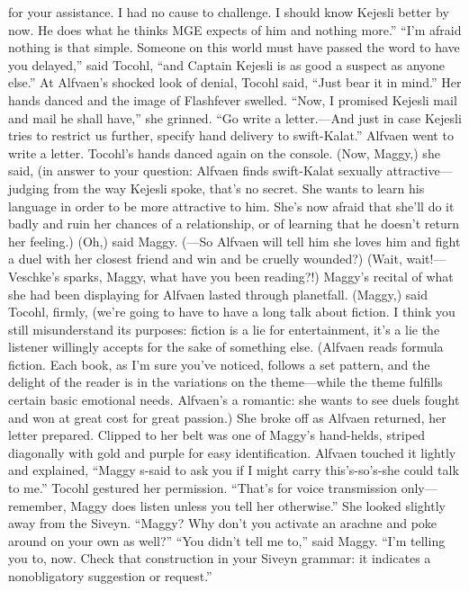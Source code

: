 \documentclass[9pt]{article}
\begin{document}
for your assistance. I had no cause to challenge. I should know Kejesli better by now. He does what he
thinks MGE expects of him and nothing more.”
“I’m afraid nothing is that simple. Someone on this world must have passed the word to have you
delayed,” said Tocohl, “and Captain Kejesli is as good a suspect as anyone else.”
At Alfvaen’s shocked look of denial, Tocohl said, “Just bear it in mind.” Her hands danced and the
image of Flashfever swelled. “Now, I promised Kejesli mail and mail he shall have,” she grinned. “Go
write a letter.—And just in case Kejesli tries to restrict us further, specify hand delivery to swift-Kalat.”
Alfvaen went to write a letter. Tocohl’s hands danced again on the console. (Now, Maggy,) she said,
(in answer to your question: Alfvaen finds swift-Kalat sexually attractive—judging from the way Kejesli
spoke, that’s no secret. She wants to learn his language in order to be more attractive to him. She’s now
afraid that she’ll do it badly and ruin her chances of a relationship, or of learning that he doesn’t return her
feeling.)
(Oh,) said Maggy. (—So Alfvaen will tell him she loves him and fight a duel with her closest friend
and win and be cruelly wounded?)
(Wait, wait!—Veschke’s sparks, Maggy, what have you been reading?!)
Maggy’s recital of what she had been displaying for Alfvaen lasted through planetfall. (Maggy,) said
Tocohl, firmly, (we’re going to have to have a long talk about fiction. I think you still misunderstand its
purposes: fiction is a lie for entertainment, it’s a lie the listener willingly accepts for the sake of something
else.
(Alfvaen reads formula fiction. Each book, as I’m sure you’ve noticed, follows a set pattern, and the
delight of the reader is in the variations on the theme—while the theme fulfills certain basic emotional
needs. Alfvaen’s a romantic: she wants to see duels fought and won at great cost for great passion.)
She broke off as Alfvaen returned, her letter prepared. Clipped to her belt was one of Maggy’s
hand-helds, striped diagonally with gold and purple for easy identification. Alfvaen touched it lightly and
explained, “Maggy s-said to ask you if I might carry this’s-so’s-she could talk to me.”
Tocohl gestured her permission. “That’s for voice transmission only—remember, Maggy does listen
unless you tell her otherwise.” She looked slightly away from the Siveyn. “Maggy? Why don’t you
activate an arachne and poke around on your own as well?”
“You didn’t tell me to,” said Maggy.
“I’m telling you to, now. Check that construction in your Siveyn grammar: it indicates a nonobligatory
suggestion or request.”
\end{document}
